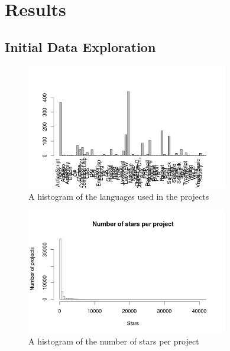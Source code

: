 \section{Results}
    \subsection{Initial Data Exploration}
	    \begin{figure}
	        \includegraphics[width=250pt]{figures/language-frequency}
	        \caption{A histogram of the languages used in the projects}
	        \label{fig:language-frequency-plot}
	    \end{figure}	    
	    
	    \begin{figure}
	        \includegraphics[width=250pt]{figures/star-distribution}
	        \caption{A histogram of the  number of stars per project}
	        \label{fig:star-distribution-plot}
	    \end{figure}
	    
